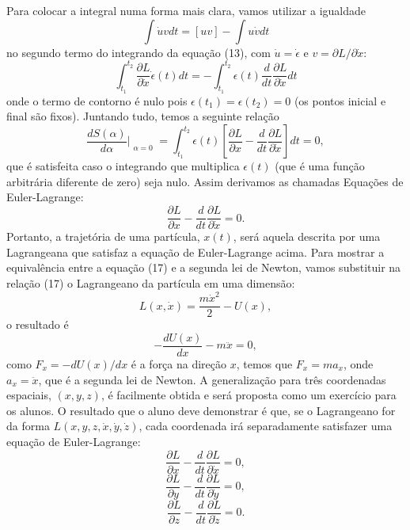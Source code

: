 \documentclass{article}
\begin{document}
Para colocar a integral numa forma mais clara, vamos utilizar a igualdade
\begin{equation}
    \int \dot{u}vdt = [uv] - \int u\dot{v}dt
\end{equation}
no segundo termo do integrando da equação (13), com $\dot{u}= \dot{\epsilon}$ e $v = \partial L/\partial \dot{x}$:
\begin{equation}
    \int_{t_1}^{t_2}\frac{\partial L}{\partial \dot{x}}\dot{\epsilon}(t)dt = -\int_{t_1}^{t_2} \epsilon(t)\frac{d}{dt}\frac{\partial L}{\partial \dot{x}}dt
\end{equation}
onde o termo de contorno é nulo pois $\epsilon(t_1) = \epsilon(t_2) = 0$ (os pontos inicial e final são fixos). Juntando tudo, temos a seguinte relação
\begin{equation}
    \frac{dS(\alpha)}{d\alpha}\Bigr|_{\substack{\alpha=0}} = \int_{t_1}^{t_2}\epsilon(t)\left[\frac{\partial L}{\partial x}-\frac{d}{dt}\frac{\partial L}{\partial \dot{x}}\right]dt = 0,
\end{equation}
que é satisfeita caso o integrando que multiplica $\epsilon(t)$ (que é uma função arbitrária diferente de zero) seja nulo. Assim derivamos as chamadas Equações de Euler-Lagrange:
\begin{equation}
    \frac{\partial L}{\partial x}-\frac{d}{dt}\frac{\partial L}{\partial \dot{x}} = 0.
\end{equation}
Portanto, a trajetória de uma partícula, $x(t)$, será aquela descrita por uma Lagrangeana que satisfaz a equação de Euler-Lagrange acima. Para mostrar a equivalência entre a equação (17) e a segunda lei de Newton, vamos substituir na relação (17) o Lagrangeano da partícula em uma dimensão: 
\begin{equation}
    L(x,\dot{x}) = \frac{m\dot{x}^2}{2} - U(x),
\end{equation}
o resultado é
\begin{equation}
    -\frac{dU(x)}{dx} - m\ddot{x} = 0,
\end{equation}
como $F_{x} = -dU(x)/dx$ é a força na direção $x$, temos que $F_{x} = ma_{x}$, onde $a_x = \ddot{x}$, que é a segunda lei de Newton. A generalização para três coordenadas espaciais, $(x,y,z)$, é facilmente obtida e será proposta como um exercício para os alunos. O resultado que o aluno deve demonstrar é que, se o Lagrangeano for da forma $L(x,y,z,\dot{x},\dot{y},\dot{z})$, cada coordenada irá separadamente satisfazer uma equação de Euler-Lagrange:
\begin{equation}
        \frac{\partial L}{\partial x}-\frac{d}{dt}\frac{\partial L}{\partial \dot{x}} = 0,
\end{equation}
\begin{equation}
        \frac{\partial L}{\partial y}-\frac{d}{dt}\frac{\partial L}{\partial \dot{y}} = 0,
\end{equation}
\begin{equation}
        \frac{\partial L}{\partial z}-\frac{d}{dt}\frac{\partial L}{\partial \dot{z}} = 0.
\end{equation}
\end{document}
